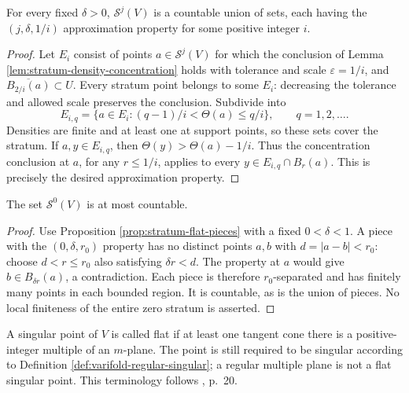 \begin{proposition}\label{prop:stratum-flat-pieces}
For every fixed $\delta>0$, $\mathcal S^j(V)$ is a countable union of sets, each having the $(j,\delta,1/i)$ approximation property for some positive integer $i$.
\end{proposition}
\begin{proof}
Let $E_i$ consist of points $a\in\mathcal S^j(V)$ for which the conclusion of Lemma \ref{lem:stratum-density-concentration} holds with tolerance and scale $\varepsilon=1/i$, and $\overline{B_{2/i}(a)}\subset U$. Every stratum point belongs to some $E_i$: decreasing the tolerance and allowed scale preserves the conclusion. Subdivide into
\[
 E_{i,q}=\{a\in E_i:(q-1)/i<\Theta(a)\leq q/i\},\qquad q=1,2,\ldots.
\]
Densities are finite and at least one at support points, so these sets cover the stratum. If $a,y\in E_{i,q}$, then $\Theta(y)>\Theta(a)-1/i$. Thus the concentration conclusion at $a$, for any $r\leq1/i$, applies to every $y\in E_{i,q}\cap B_r(a)$. This is precisely the desired approximation property.
\end{proof}

\begin{corollary}\label{cor:zero-stratum-countable}
The set $\mathcal S^0(V)$ is at most countable.
\end{corollary}
\begin{proof}
Use Proposition \ref{prop:stratum-flat-pieces} with a fixed $0<\delta<1$. A piece with the $(0,\delta,r_0)$ property has no distinct points $a,b$ with $d=|a-b|<r_0$: choose $d<r\leq r_0$ also satisfying $\delta r<d$. The property at $a$ would give $b\in B_{\delta r}(a)$, a contradiction. Each piece is therefore $r_0$-separated and has finitely many points in each bounded region. It is countable, as is the union of pieces. No local finiteness of the entire zero stratum is asserted.
\end{proof}

\begin{definition}\label{def:flat-singular-point}
A singular point of $V$ is called flat if at least one tangent cone there is a positive-integer multiple of an $m$-plane. The point is still required to be singular according to Definition \ref{def:varifold-regular-singular}; a regular multiple plane is not a flat singular point. This terminology follows \cite{Minter}, p.~20.
\end{definition}

